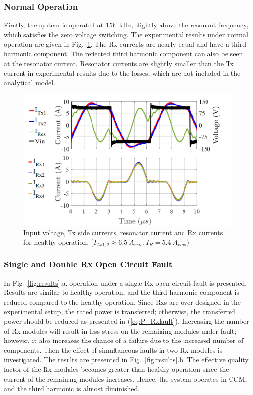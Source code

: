 \documentclass[journal]{IEEEtran}
\begin{document}
\subsubsection{Normal Operation}
Firstly, the system is operated at 156~kHz, slightly above the resonant frequency, which satisfies the zero voltage switching. 
The experimental results under normal operation are given in Fig.~\ref{fig:normaloperation}. 
The Rx currents are nearly equal and have a third harmonic component. 
The reflected third harmonic component can also be seen at the resonator current.
Resonator currents are slightly smaller than the Tx current in experimental results due to the losses, which are not included in the analytical model.
\begin{figure}[h!]
   \centering
        	\includegraphics[width=0.90\linewidth]{healthy_new3.png}
     \caption{Input voltage, Tx side currents, resonator current and Rx currents for healthy operation. ($I_{Tx1,2}\approx 6.5~A_{rms},I_{R}=5.4~A_{rms}$)  }
        \label{fig:normaloperation}
\end{figure}

\subsubsection{Single and Double Rx Open Circuit Fault}
In Fig.~\ref{fig:results}.a, operation under a single Rx open circuit fault is presented. Results are similar to healthy operation, and the third harmonic component is reduced compared to the healthy operation. 
Since Rxs are over-designed in the experimental setup, the rated power is transferred; otherwise, the transferred power should be reduced as presented in (\ref{eq:P_Rxfault}). 
Increasing the number of Rx modules will result in less stress on the remaining modules under fault; however, it also increases the chance of a failure due to the increased number of components.
Then the effect of simultaneous faults in two Rx modules is investigated. 
The results are presented in Fig.~\ref{fig:results}.b. 
The effective quality factor of the Rx modules becomes greater than healthy operation since the current of the remaining modules increases. Hence, the system operates in CCM, and the third harmonic is almost diminished. 
\end{document}
